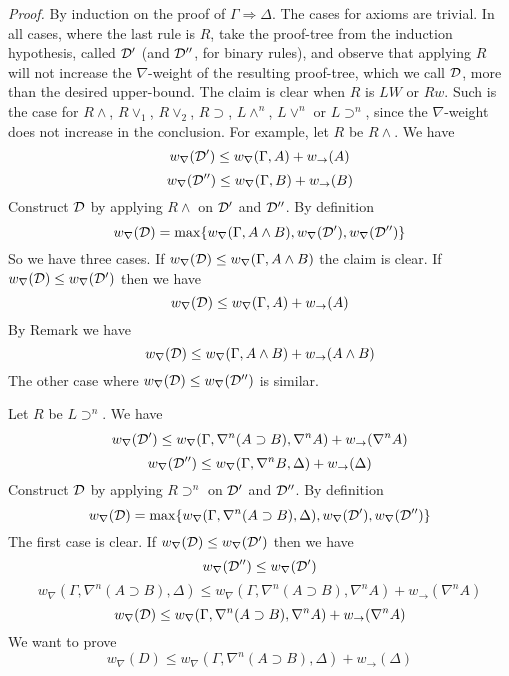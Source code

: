 \documentclass[a4paper, 12pt]{paper}
\begin{document}
\emph{Proof.} By induction on the proof of $\Gamma \Rightarrow \Delta$. The cases for axioms are trivial. In all cases, where the last rule is $R$, take the proof-tree from the induction hypothesis, called $\mathcal{D}'$ (and $\mathcal{D}''$, for binary rules), and observe that applying $R$ will not increase the $\nabla$-weight of the resulting proof-tree, which we call $\mathcal{D}$, more than the desired upper-bound. The claim is clear when $R$ is $LW$ or $Rw$. Such is the case for $R \wedge$, $R \vee_1$, $R \vee_2$, $R \supset$, $L \wedge^n$, $L \vee^n$ or $L \supset^n$, since the $\nabla$-weight does not increase in the conclusion. For example, let $R$ be $R \wedge$. We have
\[ w_\nabla(\mathcal{D}') \le w_\nabla(\Gamma, A) + w_\rightarrow(A) \]
\[ w_\nabla(\mathcal{D}'') \le w_\nabla(\Gamma, B) + w_\rightarrow(B) \]
Construct $\mathcal{D}$ by applying $R \wedge$ on $\mathcal{D}'$ and $\mathcal{D}''$. By definition
\[ w_\nabla(\mathcal{D}) = \max\{w_\nabla(\Gamma, A \wedge B), w_\nabla(\mathcal{D}'), w_\nabla(\mathcal{D}'')\} \]
So we have three cases. If $w_\nabla(\mathcal{D}) \le w_\nabla(\Gamma, A \wedge B)$ the claim is clear. If $w_\nabla(\mathcal{D}) \le w_\nabla(\mathcal{D}')$ then we have
\[ w_\nabla(\mathcal{D}) \le w_\nabla(\Gamma, A) + w_\rightarrow(A) \]
By Remark we have
\[ w_\nabla(\mathcal{D}) \le w_\nabla(\Gamma, A \wedge B) + w_\rightarrow(A \wedge B) \]
The other case where $w_\nabla(\mathcal{D}) \le w_\nabla(\mathcal{D}'')$ is similar.

Let $R$ be $L \supset^n$. We have
\[ w_\nabla(\mathcal{D}') \le w_\nabla(\Gamma, \nabla^n (A \supset B), \nabla^n A) + w_\rightarrow(\nabla^n A) \]
\[ w_\nabla(\mathcal{D}'') \le w_\nabla(\Gamma, \nabla^n B, \Delta) + w_\rightarrow(\Delta) \]
Construct $\mathcal{D}$ by applying $R \supset^n$ on $\mathcal{D}'$ and $\mathcal{D}''$. By definition
\[ w_\nabla(\mathcal{D}) = \max\{w_\nabla(\Gamma, \nabla^n (A \supset B), \Delta), w_\nabla(\mathcal{D}'), w_\nabla(\mathcal{D}'')\} \]
The first case is clear. If $w_\nabla(\mathcal{D}) \le w_\nabla(\mathcal{D}')$ then we have
\[ w_\nabla(\mathcal{D}'') \le w_\nabla(\mathcal{D}') \]
\[ w_\nabla(\Gamma, \nabla^n (A \supset B), \Delta) \le w_\nabla(\Gamma, \nabla^n (A \supset B), \nabla^n A) + w_\rightarrow(\nabla^n A) \]
\[ w_\nabla(\mathcal{D}) \le w_\nabla(\Gamma, \nabla^n (A \supset B), \nabla^n A) + w_\rightarrow(\nabla^n A) \]
We want to prove
\[ w_\nabla(D) \le w_\nabla(\Gamma, \nabla^n (A \supset B), \Delta) + w_\rightarrow(\Delta) \]
\end{document}
